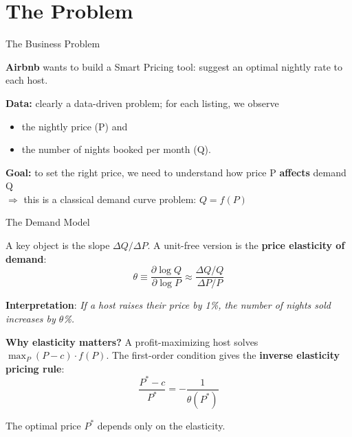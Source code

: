 \documentclass[aspectratio=169, 11pt]{beamer}
\begin{document}
\section{The Problem}
\begin{frame}{The Business Problem}

\textbf{Airbnb} wants to build a Smart Pricing tool: suggest an optimal nightly rate to each host. 

\bigskip

\textbf{Data:} clearly a data-driven problem; for each listing, we observe 
\begin{itemize}
    \item the nightly price (P) and 
    \item the number of nights booked per month (Q).
\end{itemize}

\bigskip

\textbf{Goal:} to set the right price, we need to understand how price P \textbf{affects} demand Q\\
$\Longrightarrow$ this is a classical demand curve problem: $Q= f(P)$

\end{frame}


\begin{frame}{The Demand Model}

A key object is the slope $\Delta Q / \Delta P$. A unit-free version is the \textbf{price elasticity of demand}:
\[
\theta \equiv \frac{\partial \log Q}{\partial \log P} \approx \frac{\Delta Q / Q}{\Delta P / P}
\]

\textbf{Interpretation}: \textit{If a host raises their price by 1\%, the number of nights sold increases by $\theta$\%.}

\bigskip
\pause

\textbf{Why elasticity matters?} A profit-maximizing host solves $\max_P (P - c) \cdot f(P)$. The first-order condition gives the \textbf{inverse elasticity pricing rule}:
\[
\frac{P^* - c}{P^*} = -\frac{1}{\theta(P^*)}
\]

The optimal price $P^*$ depends only on the elasticity.

\end{frame}
\end{document}
